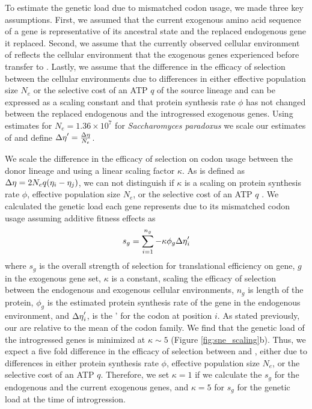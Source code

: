 To estimate the genetic load due to mismatched codon usage, we made three key assumptions.
First, we assumed that the current exogenous amino acid sequence of a gene is representative of its ancestral state and the replaced endogenous gene it replaced.
Second, we assume that the currently observed cellular environment of \gossypii reflects the cellular environment that the exogenous genes experienced before transfer to \kluyveri.
Lastly, we assume that the difference in the efficacy of selection between the cellular environments due to differences in either effective population size $N_e$ or the selective cost of an ATP $q$ of the source lineage and \kluyveri can be expressed as a scaling constant and that protein synthesis rate $\phi$ has not changed between the replaced endogenous and the introgressed exogenous genes.
Using estimates for $N_e = 1.36\times10^7$ \citep{wagner2005} for \textit{Saccharomyces paradoxus} we scale our estimates of \DE and define ${\Delta \eta}' = \frac{{\Delta \eta}}{N_e}$.

We scale the difference in the efficacy of selection on codon usage between the donor lineage and \kluyveri using a linear scaling factor $\kappa$.
As \DE is defined as ${\Delta \eta} = 2N_eq(\eta_i-\eta_j)$, we can not distinguish if $\kappa$ is a scaling on protein synthesis rate $\phi$, effective population size $N_e$, or the selective cost of an ATP $q$ \citep{gilchrist2007, gilchrist2015}.
We calculated the genetic load each gene represents due to its mismatched codon usage assuming additive fitness effects as 
\begin{equation}
s_g = \sum_{i=1}^{n_g} -\kappa \phi_g {\Delta \eta}'_i 
\end{equation}
where $s_g$ is the overall strength of selection for translational efficiency on gene, $g$  in the exogenous gene set, $\kappa$ is a constant, scaling the efficacy of selection between the endogenous and exogenous cellular environments, $n_{g}$ is length of the protein, $\phi_g$ is the estimated protein synthesis rate of the gene in the endogenous environment, and ${\Delta \eta}'_i$, is the \DE' for the codon at position $i$.
As stated previously, our \DE are relative to the mean of the codon family.
We find that the genetic load of the introgressed genes is minimized at $\kappa \sim 5$ (Figure \ref{fig:sne_scaling}b).
Thus, we expect a five fold difference in the efficacy of selection between \kluyveri and \gossypii, either due to differences in either protein synthesis rate $\phi$, effective population size $N_e$, or the selective cost of an ATP $q$.
Therefore, we set $\kappa = 1$ if we calculate the $s_g$ for the endogenous and the current exogenous genes, and $\kappa = 5$ for $s_g$ for the genetic load at the time of introgression.

